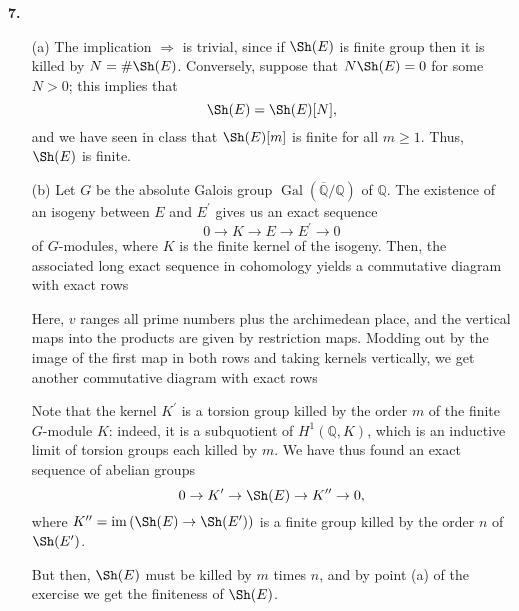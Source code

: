 \documentclass[a4paper]{article}
\newcommand{\Q}{\mathbb{Q}}
\newcommand{\ssfrac}[2]{
        \raisebox{+0.3ex}{$#1$}
        /
        \raisebox{-0.3ex}{$#2$}
}
\newcommand{\im}{\operatorname{im}}
\theoremstyle{definition}
\theoremstyle{definition}
\theoremstyle{remark}
\theoremstyle{definition}
\begin{document}
\textbf{7. }
\begin{itemize}
    \item[(a)] The implication $\Rightarrow$ is trivial, since if $\Sh(E)$ is finite group then it is killed by $N=\#\Sh(E)$. Conversely, suppose that $N\Sh(E)=0$ for some $N>0$; this implies that
        \[
            \Sh(E)=\Sh(E)[N],
        \] and we have seen in class that $\Sh(E)[m]$ is finite for all $m\geq 1$. Thus, $\Sh(E)$ is finite.
    \item[(b)] Let $G$ be the absolute Galois group $\operatorname{Gal}(\overline{\Q}/\Q)$ of $\Q$.
        The existence of an isogeny between $E$ and $E^\prime$ gives us an exact sequence
        \[
            0 \to K \to E \to E^\prime \to 0
        \]
        of $G$-modules, where $K$ is the finite kernel of the isogeny. Then, the associated long exact sequence in cohomology yields a commutative diagram with exact rows
        \begin{center}
        \end{center}
        Here, $v$ ranges all prime numbers plus the archimedean place, and the vertical maps into the products are given by restriction maps. Modding out by the image of the first
        map in both rows and taking kernels vertically, we get another commutative diagram with exact rows
        \begin{center}
        \end{center}
        Note that the kernel $K^\prime$ is a torsion group killed by the order $m$ of the finite $G$-module $K$: indeed, it is a subquotient of $H^1(\Q,K)$, which is an inductive
        limit of torsion groups each killed by $m$. We have thus found an exact sequence of abelian groups
        \[
            0 \to K^\prime \to \Sh(E) \to K^{\prime\prime} \to 0,
        \]
        where $K^{\prime\prime}=\im{(\Sh(E)\to\Sh(E^\prime))}$ is a finite group killed by the order $n$ of $\Sh(E^\prime)$.

        But then, $\Sh(E)$ must be killed by $m$ times $n$, and by point (a) of the exercise we get
        the finiteness of $\Sh(E)$.


\end{itemize}
\end{document}
